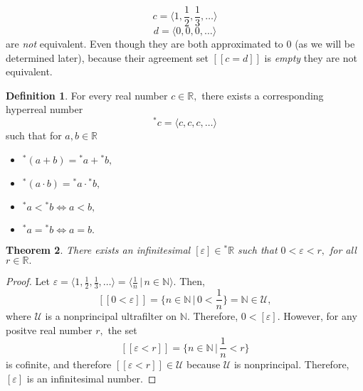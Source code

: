 \documentclass[12pt]{amsart}
\newcommand{\eps}{\varepsilon}
\newcommand{\stt}{{}^*}
\newcommand{\NN}{\mathbb{N}}
\newcommand{\RR}{\mathbb{R}}
\newcommand{\mcU}{\mathcal{U}}
\theoremstyle{plain}
\newtheorem{thm}{Theorem}
\theoremstyle{definition}
\newtheorem{defn}[thm]{Definition}
\theoremstyle{remark}
\theoremstyle{theorem}
\numberwithin{equation}{section}
\numberwithin{thm}{section}
\begin{document}
\[c = \langle 1, \frac{1}{2}, \frac{1}{3}, \ldots \rangle\]
\[d = \langle 0, 0, 0, \ldots \rangle\]
are \textit{not} equivalent. Even though they are both approximated to $0$ (as we will be determined later), because their agreement set $[[c = d]]$ is \textit{empty} they are not equivalent. 
\begin{defn}
For every real number $c \in \RR,$ there exists a corresponding hyperreal number \[\stt c = \langle c, c, c, \ldots \rangle\]
such that for $a,b \in \RR$
\begin{itemize}
    \item $\stt (a+b) = \stt a + \stt b,$
    \item $\stt (a \cdot b) = \stt a \cdot \stt b,$
    \item $\stt a < \stt b \iff a < b,$
    \item $\stt a = \stt b \iff a = b.$
\end{itemize}
\end{defn}
\begin{thm}
There exists an infinitesimal $[\eps] \in \stt \RR$ such that $0 < \eps < r,$ for all $r \in \RR.$ \label{infinitesimal}
\end{thm}
\begin{proof}
Let $\eps = \langle 1, \frac{1}{2}, \frac{1}{3}, \ldots \rangle = \langle \frac{1}{n} \, | \, n \in \NN \rangle.$ Then, \[ [[ 0 < \eps ]] = \{n \in \NN \, | \, 0 < \frac{1}{n} \} = \NN \in \mcU,\] where $\mcU$ is a nonprincipal ultrafilter on $\NN.$ Therefore, $0 < [\eps].$ However, for any positve real number $r,$ the set 
\[[[\eps < r]] = \{n \in \NN \, | \, \frac{1}{n} < r \} \] is cofinite, and therefore $[[\eps < r]] \in \mcU$ because $\mcU$ is nonprincipal. Therefore, $[\eps]$ is an infinitesimal number.
\end{proof}
\end{document}

